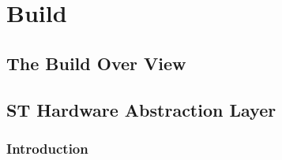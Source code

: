 \chapter{Build}

\section{The Build Over View}


\section{ST Hardware Abstraction Layer}

\subsection{Introduction}


\section{}

